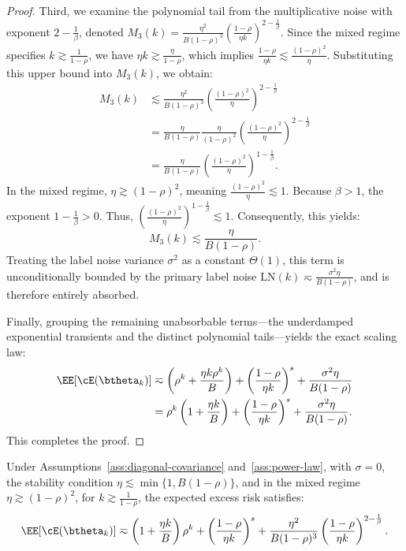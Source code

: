 \begin{proof}
Third, we examine the polynomial tail from the multiplicative noise with exponent $2-\frac{1}{\beta}$, denoted $M_3(k) = \frac{\eta^2}{B(1-\rho)^3}\left(\frac{1-\rho}{\eta k}\right)^{2-\frac1\beta}$.
Since the mixed regime specifies $k \gtrsim \frac{1}{1-\rho}$, we have $\eta k \gtrsim \frac{\eta}{1-\rho}$, which implies $\frac{1-\rho}{\eta k} \lesssim \frac{(1-\rho)^2}{\eta}$. 
Substituting this upper bound into $M_3(k)$, we obtain:
\begin{align*}
    M_3(k) &\lesssim \frac{\eta^2}{B(1-\rho)^3} \left(\frac{(1-\rho)^2}{\eta}\right)^{2-\frac{1}{\beta}} \\
    &= \frac{\eta}{B(1-\rho)} \frac{\eta}{(1-\rho)^2} \left(\frac{(1-\rho)^2}{\eta}\right)^{2-\frac{1}{\beta}} \\
    &= \frac{\eta}{B(1-\rho)} \left(\frac{(1-\rho)^2}{\eta}\right)^{1-\frac{1}{\beta}}.
\end{align*}
In the mixed regime, $\eta \gtrsim (1-\rho)^2$, meaning $\frac{(1-\rho)^2}{\eta} \lesssim 1$. Because $\beta > 1$, the exponent $1-\frac{1}{\beta} > 0$. Thus, $\left(\frac{(1-\rho)^2}{\eta}\right)^{1-\frac{1}{\beta}} \lesssim 1$.
Consequently, this yields:
\begin{equation*}
    M_3(k) \lesssim \frac{\eta}{B(1-\rho)}.
\end{equation*}
Treating the label noise variance $\sigma^2$ as a constant $\Theta(1)$, this term is unconditionally bounded by the primary label noise $\text{LN}(k) \eqsim \frac{\sigma^2\eta}{B(1-\rho)}$, and is therefore entirely absorbed.

Finally, grouping the remaining unabsorbable terms—the underdamped exponential transients and the distinct polynomial tails—yields the exact scaling law:
\begin{align*}
    \EE[\cE(\btheta_k)]
    &\eqsim \left( \rho^k + \frac{\eta k\rho^k}{B} \right) + \left(\frac{1-\rho}{\eta k}\right)^s + \frac{\sigma^2\eta}{B(1-\rho)} \\
    &= \rho^k\left(1+\frac{\eta k}{B}\right) + \left(\frac{1-\rho}{\eta k}\right)^s + \frac{\sigma^2\eta}{B(1-\rho)}.
\end{align*}
This completes the proof.
\end{proof}


\begin{theorem}
\label{thm:pol_two_sided_scaling_noiseless}
Under Assumptions~\ref{ass:diagonal-covariance} and~\ref{ass:power-law}, with \(\sigma=0\), the stability condition \(\eta\lesssim \min\{1,B(1-\rho)\}\), and in the mixed regime \(\eta\gtrsim(1-\rho)^2\), for \(k \gtrsim \frac{1}{1-\rho}\), the expected excess risk satisfies:
\begin{equation}
\label{eq:pol_two_sided_scaling_noiseless}
    \EE[\cE(\btheta_k)]
    \eqsim
    \left(
        1+\frac{\eta k}{B}
    \right)\rho^k
    +
    \left(\frac{1-\rho}{\eta k}\right)^s
    +
    \frac{\eta^2}{B(1-\rho)^3}
    \left(\frac{1-\rho}{\eta k}\right)^{2-\frac1\beta}.
\end{equation}
\end{theorem}

